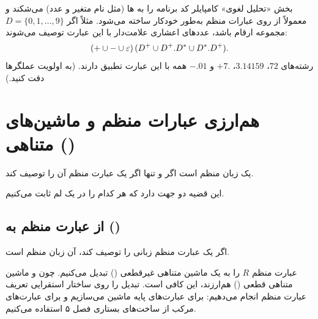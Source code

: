 \begin{example}
بخش «تحلیل لغوی» کامپایلر کد برنامه را به ها (مثل نام متغیر و عدد) می‌شکند و معمولاً از روی عبارات منظم به‌طور خودکار ساخته می‌شود. مثلاً اگر $D=\{0,1,\dots,9\}$ مجموعه ارقام باشد، عددهای اعشاری علامت‌دار با این عبارت توصیف می‌شوند:
\[(+\cup-\cup\varepsilon)\,(D^+\cup D^+.D^*\cup D^*.D^+).\]
رشته‌های $72$، $3.14159$، $+7.$ و $-.01$ همه با این عبارت تطبیق دارند. (به اولویت عملگرها دقت کنید.)
\end{example}

\section{هم‌ارزی عبارات منظم و ماشین‌های متناهی ()}

\begin{theorem}\label{thm:re-equiv}
یک زبان منظم است اگر و تنها اگر یک عبارت منظم آن را توصیف کند.
\end{theorem}

این قضیه دو جهت دارد که هر کدام را در یک لم ثابت می‌کنیم.

\subsection{از عبارت منظم به  ()}

\begin{lemma}\label{lem:re-nfa}
اگر یک عبارت منظم زبانی را توصیف کند، آن زبان منظم است.
\end{lemma}

\begin{proofidea}
عبارت منظم $R$ را به یک ماشین متناهی غیرقطعی () تبدیل می‌کنیم. چون  و ماشین متناهی قطعی () هم‌ارزند، این کافی است. تبدیل را روی ساختار استقرایی تعریف عبارت منظم انجام می‌دهیم: برای عبارت‌های پایه ماشین می‌سازیم و برای عبارت‌های مرکب از ساخت‌های بستاری فصل ۵ استفاده می‌کنیم.
\end{proofidea}

